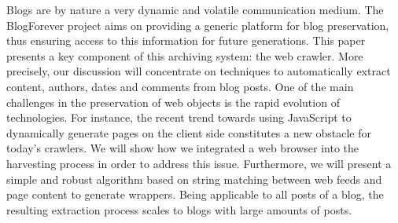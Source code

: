 Blogs are by nature a very dynamic and volatile communication medium. The BlogForever project aims on providing a generic platform for blog preservation, thus ensuring access to this information for future generations. This paper presents a key component of this archiving system: the web crawler. More precisely, our discussion will concentrate on techniques to automatically extract content, authors, dates and comments from blog posts. One of the main challenges in the preservation of web objects is the rapid evolution of technologies. For instance, the recent trend towards using JavaScript to dynamically generate pages on the client side constitutes a new obstacle for today's crawlers. We will show how we integrated a web browser into the harvesting process in order to address this issue. Furthermore, we will present a simple and robust algorithm based on string matching between web feeds and page content to generate wrappers. Being applicable to all posts of a blog, the resulting extraction process scales to blogs with large amounts of posts.
